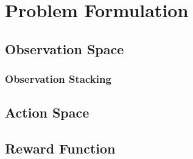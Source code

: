 \chapter{Problem Formulation}


\section{Observation Space}

\subsection{Observation Stacking}



\section{Action Space}


\section{Reward Function}

